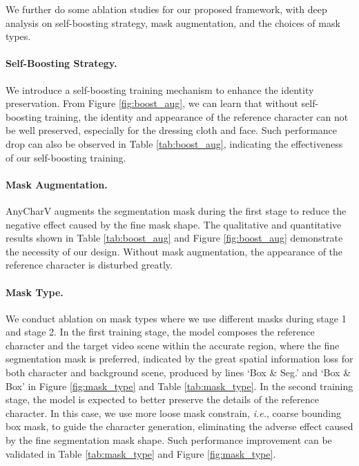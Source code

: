 We further do some ablation studies for our proposed framework, with deep analysis on self-boosting strategy, mask augmentation, and the choices of mask types.







\paragraph{Self-Boosting Strategy.}

We introduce a self-boosting training mechanism to enhance the identity preservation.
From Figure \ref{fig:boost_aug}, we can learn that without self-boosting training, the identity and appearance of the reference character can not be well preserved, especially for the dressing cloth and face. 
Such performance drop can also be observed in Table \ref{tab:boost_aug}, indicating the effectiveness of our self-boosting training.


\paragraph{Mask Augmentation.}
AnyCharV augments the segmentation mask during the first stage to reduce the negative effect caused by the fine mask shape.
The qualitative and quantitative results shown in Table \ref{tab:boost_aug} and Figure \ref{fig:boost_aug} demonstrate the necessity of our design.
Without mask augmentation, the appearance of the reference character is disturbed greatly.


\paragraph{Mask Type.}
We conduct ablation on mask types where we use different masks during stage 1 and stage 2.
In the first training stage, the model composes the reference character and the target video scene within the accurate region, where the fine segmentation mask is preferred, indicated by the great spatial information loss for both character and background scene, produced by lines `Box \& Seg.' and `Box \& Box' in Figure \ref{fig:mask_type} and Table \ref{tab:mask_type}.
In the second training stage, the model is expected to better preserve the details of the reference character.
In this case, we use more loose mask constrain, {\it i.e.}, coarse bounding box mask, to guide the character generation, eliminating the adverse effect caused by the fine segmentation mask shape.
Such performance improvement can be validated in Table \ref{tab:mask_type} and Figure \ref{fig:mask_type}.

















